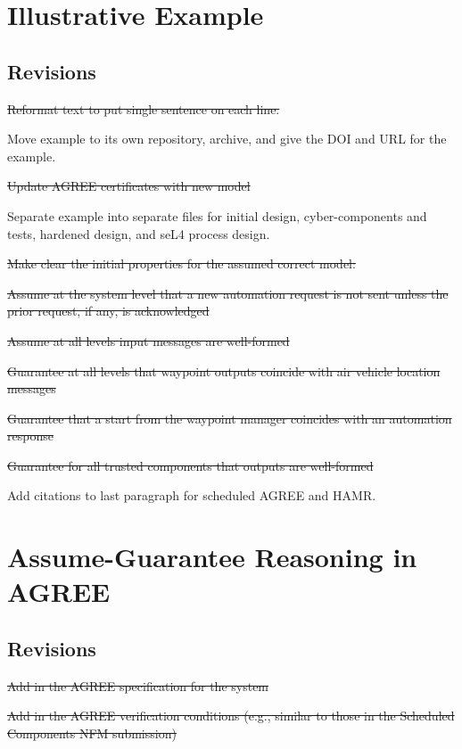 \documentclass[global,twocolumn]{svjour}
\begin{document}
\section{Illustrative Example}
\label{sec:example}


\subsection{Revisions}
\begin{compactitem}
  \item \sout{Reformat text to put single sentence on each line.}
  \item Move example to its own repository, archive, and give the DOI and URL for the example.
  \item \sout{Update AGREE certificates with new model}
  \item Separate example into separate files for initial design, cyber-components and tests, hardened design, and seL4 process design.
  \item \sout{Make clear the initial properties for the assumed correct model:}
    \begin{compactitem}
      \item \sout{Assume at the system level that a new automation request is not sent unless the prior request, if any, is acknowledged}
      \item \sout{Assume at all levels input messages are well-formed}
      \item \sout{Guarantee at all levels that waypoint outputs coincide with air vehicle location messages}
      \item \sout{Guarantee that a start from the waypoint manager coincides with an automation response}
      \item \sout{Guarantee for all trusted components that outputs are well-formed}
    \end{compactitem}
  \item Add citations to last paragraph for scheduled AGREE and HAMR.
\end{compactitem}

\section{Assume-Guarantee Reasoning in AGREE}
\label{sec:agree}


\subsection{Revisions}
\begin{compactitem}
  \item \sout{Add in the AGREE specification for the system}
  \item \sout{Add in the AGREE verification conditions (e.g., similar to those in the Scheduled Components NFM submission)}
\end{compactitem}
\end{document}
